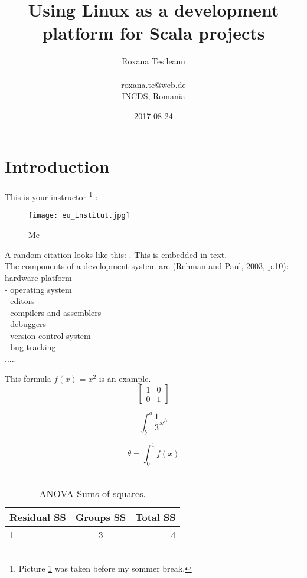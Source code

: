 \documentclass{article}
\title{Using Linux as a development platform for Scala projects}
\date{2017-08-24}
\author{Roxana Tesileanu \\ 
\\ 
roxana.te@web.de \\
INCDS, Romania }
\begin{document}
	\maketitle
	\newpage

\tableofcontents
\newpage

\section{Introduction}

This is your instructor \footnote{\label{footnote1}Picture \ref{fig: Roxi} was taken before my sommer break.} : 
\\
\begin{figure} [H]
 \texttt{[image: eu\_institut.jpg]}
 \caption{Me}
 \label{fig: Roxi}
\end{figure}


\newpage
A random citation looks like this:
\cite{odersky_programming_2010}. This is embedded in text. \\
The components of a development system are (Rehman and Paul, 2003, p.10):\newline
- hardware platform \\
- operating system \\
- editors \\
- compilers and assemblers \\
- debuggers \\
- version control system \\
- bug tracking \\

.....

This formula $f(x) = x^2$ is an example.
\begin{equation}
\left[
\begin{matrix}
1 & 0 \\
0 & 1
\end{matrix}
\right]
\end{equation}

\begin{equation}
\int^a_b\frac{1}{3}x^3
\end{equation}

\begin{equation}
\theta = \int^1_0 f(x)
\end{equation}
\\

\begin{table}[h!]
\centering
\caption{ANOVA Sums-of-squares.}
\label{tab: table1}
\begin{tabular}{l|c|r}

Residual SS & Groups SS & Total SS \\
\hline
1 & 3 & 4 \\

\end{tabular}
\end{table}
\end{document}
